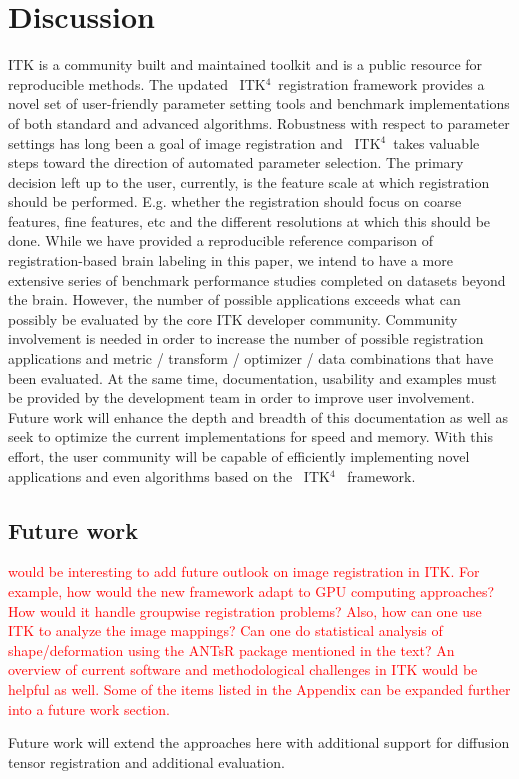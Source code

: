 \documentclass{frontiersSCNS}
\newcommand{\tk}{~ITK$^{\text{4}}$~}
\begin{document}
\section{Discussion} 
ITK is a community built and maintained toolkit and is a public
resource for reproducible methods.  The updated \tk registration
framework provides a novel set of user-friendly parameter setting
tools and benchmark implementations of both standard and advanced
algorithms.  Robustness with respect to parameter settings has long
been a goal of image registration and \tk takes valuable steps toward
the direction of automated parameter selection.  The primary decision
left up to the user, currently, is the feature scale at which
registration should be performed.  E.g. whether the registration should focus on coarse features, fine
features, etc and the different resolutions at which this should be
done.  While we have provided a reproducible reference comparison of
registration-based brain labeling in this paper, we intend to have a more extensive series of benchmark performance studies
completed on datasets beyond the brain.  However, the number of
possible applications exceeds what can possibly be evaluated by the
core ITK developer community.  Community involvement is needed in order to increase the
number of possible registration applications and metric / transform /
optimizer / data combinations that have been evaluated.  At the same
time, documentation, usability and examples must be provided by the
development team in order to improve user involvement.  Future work
will enhance the depth and breadth of this documentation as well as
seek to optimize the current implementations for speed and memory.
With this effort, the user community will be capable of efficiently
implementing novel applications and even algorithms based on the \tk
framework.




\subsection{Future work}

\textcolor{red}{would be interesting to add future outlook on image registration in ITK. For example, how would the new framework adapt to GPU computing approaches? How would it handle groupwise registration problems? Also, how can one use ITK to analyze the image mappings? Can one do statistical analysis of shape/deformation using the ANTsR package mentioned in the text? An overview of current software and methodological challenges in ITK would be helpful as well. Some of the items listed in the Appendix can be expanded further into a future work section. }

Future work will extend the approaches here with additional support
for diffusion tensor registration and additional evaluation.





\end{document}

